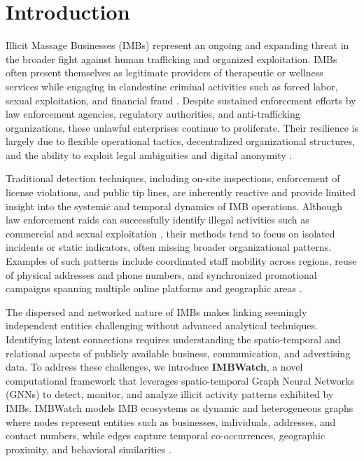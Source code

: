 \documentclass[letterpaper]{article} %
\begin{document}
\begin{links}
\end{links}

\section{Introduction}

Illicit Massage Businesses (IMBs) represent an ongoing and expanding threat in the broader fight against human trafficking and organized exploitation. IMBs often present themselves as legitimate providers of therapeutic or wellness services while engaging in clandestine criminal activities such as forced labor, sexual exploitation, and financial fraud \cite{dubrawski2015leveraging, latonero2011human, albert2024trauma}. Despite sustained enforcement efforts by law enforcement agencies, regulatory authorities, and anti-trafficking organizations, these unlawful enterprises continue to proliferate. Their resilience is largely due to flexible operational tactics, decentralized organizational structures, and the ability to exploit legal ambiguities and digital anonymity \cite{dubrawski2015leveraging}.

Traditional detection techniques, including on-site inspections, enforcement of license violations, and public tip lines, are inherently reactive and provide limited insight into the systemic and temporal dynamics of IMB operations. Although law enforcement raids can successfully identify illegal activities such as commercial and sexual exploitation \cite{albert2024trauma}, their methods tend to focus on isolated incidents or static indicators, often missing broader organizational patterns. Examples of such patterns include coordinated staff mobility across regions, reuse of physical addresses and phone numbers, and synchronized promotional campaigns spanning multiple online platforms and geographic areas \cite{latonero2011human}.

The dispersed and networked nature of IMBs makes linking seemingly independent entities challenging without advanced analytical techniques. Identifying latent connections requires understanding the spatio-temporal and relational aspects of publicly available business, communication, and advertising data. To address these challenges, we introduce \textbf{IMBWatch}, a novel computational framework that leverages spatio-temporal Graph Neural Networks (GNNs) to detect, monitor, and analyze illicit activity patterns exhibited by IMBs. IMBWatch models IMB ecosystems as dynamic and heterogeneous graphs where nodes represent entities such as businesses, individuals, addresses, and contact numbers, while edges capture temporal co-occurrences, geographic proximity, and behavioral similarities \cite{kipf2017semi, velickovic2018graph, yu2018spatio, li2018diffusion, zhao2023learning}.
\end{document}
